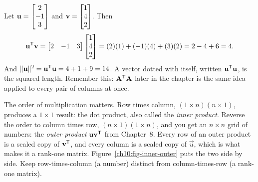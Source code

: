 \begin{example}\label{ch10:ex-dot}
Let $\mathbf{u}=\begin{bmatrix}2\\-1\\3\end{bmatrix}$ and $\mathbf{v}=\begin{bmatrix}1\\4\\2\end{bmatrix}$. Then
\[
  \mathbf{u}^{\mathsf{T}}\mathbf{v}
  = \begin{bmatrix} 2 & -1 & 3 \end{bmatrix}\begin{bmatrix}1\\4\\2\end{bmatrix}
  = (2)(1)+(-1)(4)+(3)(2) = 2-4+6 = 4.
\]
And $\lVert\mathbf{u}\rVert^2 = \mathbf{u}^{\mathsf{T}}\mathbf{u} = 4+1+9 = 14$. A vector dotted with itself, written
$\mathbf{u}^{\mathsf{T}}\mathbf{u}$, is the squared length. Remember this: $\mathbf{A}^{\mathsf{T}}\mathbf{A}$ later in the chapter is
the same idea applied to every pair of columns at once.

The order of multiplication matters. Row times column, $(1\times n)(n\times 1)$, produces
a $1\times 1$ result: the dot product, also called the \emph{inner product}. Reverse the order to
column times row, $(n\times 1)(1\times n)$, and you get an $n\times n$ grid of numbers: the
\emph{outer product} $\mathbf{u}\mathbf{v}^{\mathsf{T}}$ from Chapter~8. Every row of an outer product is a scaled
copy of $\mathbf{v}^{\mathsf{T}}$, and every column is a scaled copy of $\vec{u}$, which is what makes it a
rank-one matrix. Figure~\ref{ch10:fig-inner-outer} puts the two side by side. Keep
row-times-column (a number) distinct from column-times-row (a rank-one matrix).
\end{example}

